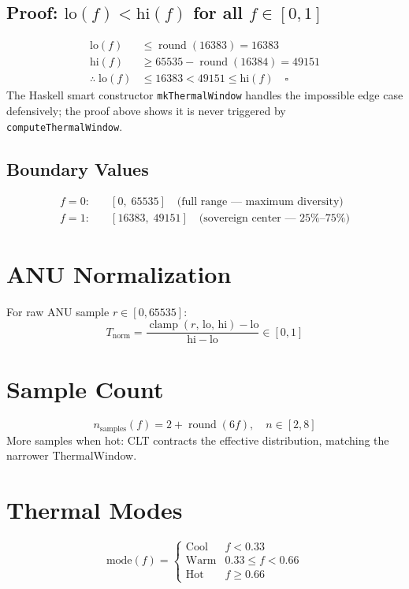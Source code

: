 \documentclass{article}
\begin{document}
\subsection{Proof: $\mathrm{lo}(f) < \mathrm{hi}(f)$ for all $f \in [0,1]$}
\begin{align}
  \mathrm{lo}(f) &\leq \operatorname{round}(16383) = 16383 \\
  \mathrm{hi}(f) &\geq 65535 - \operatorname{round}(16384) = 49151 \\
  \therefore\; \mathrm{lo}(f) &\leq 16383 < 49151 \leq \mathrm{hi}(f) \quad \square
\end{align}
The Haskell smart constructor \texttt{mkThermalWindow} handles the impossible edge case defensively; the proof above shows it is never triggered by \texttt{computeThermalWindow}.

\subsection{Boundary Values}
\begin{align}
  f = 0:&\quad [0,\; 65535] \quad \text{(full range --- maximum diversity)} \\
  f = 1:&\quad [16383,\; 49151] \quad \text{(sovereign center --- 25\%--75\%)}
\end{align}

\section{ANU Normalization}
For raw ANU sample $r \in [0, 65535]$:
\begin{equation}
  T_{\mathrm{norm}} = \frac{\operatorname{clamp}(r,\, \mathrm{lo},\, \mathrm{hi}) - \mathrm{lo}}{\mathrm{hi} - \mathrm{lo}} \in [0, 1]
\end{equation}

\section{Sample Count}
\begin{equation}
  n_{\mathrm{samples}}(f) = 2 + \operatorname{round}(6f), \quad n \in [2, 8]
\end{equation}
More samples when hot: CLT contracts the effective distribution, matching the narrower ThermalWindow.

\section{Thermal Modes}
\begin{equation}
  \mathrm{mode}(f) = \begin{cases}
    \text{Cool} & f < 0.33 \\
    \text{Warm} & 0.33 \leq f < 0.66 \\
    \text{Hot}  & f \geq 0.66
  \end{cases}
\end{equation}
\end{document}
